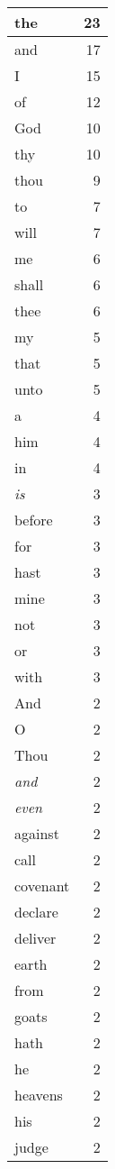 \begin{center}
\begin{longtable}{l|r}
\hline \hline
\endlastfoot
the & 23 \\ \hline
and & 17 \\ \hline
I & 15 \\ \hline
of & 12 \\ \hline
God & 10 \\ \hline
thy & 10 \\ \hline
thou & 9 \\ \hline
to & 7 \\ \hline
will & 7 \\ \hline
me & 6 \\ \hline
shall & 6 \\ \hline
thee & 6 \\ \hline
my & 5 \\ \hline
that & 5 \\ \hline
unto & 5 \\ \hline
a & 4 \\ \hline
him & 4 \\ \hline
in & 4 \\ \hline
\emph{is} & 3 \\ \hline
before & 3 \\ \hline
for & 3 \\ \hline
hast & 3 \\ \hline
mine & 3 \\ \hline
not & 3 \\ \hline
or & 3 \\ \hline
with & 3 \\ \hline
And & 2 \\ \hline
O & 2 \\ \hline
Thou & 2 \\ \hline
\emph{and} & 2 \\ \hline
\emph{even} & 2 \\ \hline
against & 2 \\ \hline
call & 2 \\ \hline
covenant & 2 \\ \hline
declare & 2 \\ \hline
deliver & 2 \\ \hline
earth & 2 \\ \hline
from & 2 \\ \hline
goats & 2 \\ \hline
hath & 2 \\ \hline
he & 2 \\ \hline
heavens & 2 \\ \hline
his & 2 \\ \hline
judge & 2 \\ \hline

\end{longtable}
\end{center}
